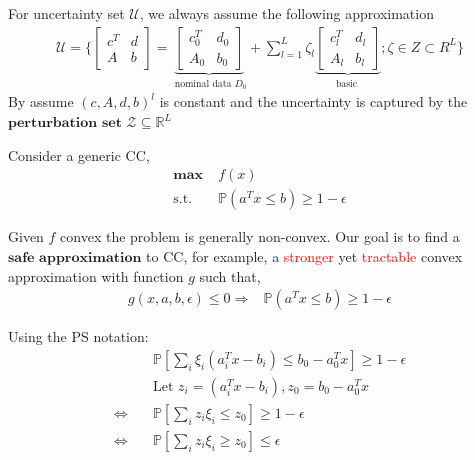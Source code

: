 \documentclass[a4pper,11pt]{article}
\newcommand{\mx}{\mathbf{\max}\;}
\newcommand{\st}{\mathrm{s.t.\;}}
\newcommand{\pr}{\mathbb P}
\begin{document}
For uncertainty set \(\mathscr{U}\), we always assume the following approximation
\begin{align}
    \mathscr{U} =\big\{\begin{bmatrix}c^{T}    & d \\ A & b \end{bmatrix}
    =\underbrace{\begin{bmatrix}c_{0}^{T}    & d_{0} \\A_{0} & b_{0}\end{bmatrix}}_{\text { nominal data } D_{0}} %
    +\sum_{l=1}^{L} \zeta_{l} \underbrace{\begin{bmatrix} c_l^T   & d_l \\  A_{l} & b_{l}\end{bmatrix}}_{\textrm {basic }}; %
    \zeta \in Z \subset R ^{L}\big\}
\end{align}
By assume \((c, A, d, b)^l\) is constant and the uncertainty is captured by the \(\textbf{perturbation set}\) \(\mathscr{Z} \subseteq \mathbb R^L\)

Consider a generic CC,
\begin{align*}
    \mx & f(x)                           \\
    \st & \pr(a^Tx \le b) \ge 1-\epsilon
\end{align*}

Given \(f\) convex the problem is generally non-convex. Our goal is to find a \(\textbf{safe approximation}\) to CC, for example, a \textcolor{red}{stronger} yet \textcolor{red}{tractable} convex approximation with function \(g\) such that,
\begin{align}
    g(x,a,b,\epsilon) \le 0 \Rightarrow & \pr(a^Tx \le b) \ge 1-\epsilon
\end{align}

Using the PS notation:
\begin{align}
                                                        & \pr\left[\sum_i \xi_i (a_i^Tx - b_i) \le b_0 - a_0 ^T x \right] \ge 1-\epsilon \\
                                                        & \textrm{Let } z_i =  (a_i^Tx - b_i), z_0 = b_0 - a_0 ^T x                      \\
    \label{eq:ro.cc.basic} \Leftrightarrow \quad        & \pr\left[\sum_i z_i \xi_i \le z_0\right] \ge 1-\epsilon                        \\
    \label{eq:ro.cc.basic_reverse}\Leftrightarrow \quad & \pr\left[\sum_i z_i \xi_i \ge z_0\right] \le \epsilon
\end{align}
\end{document}
